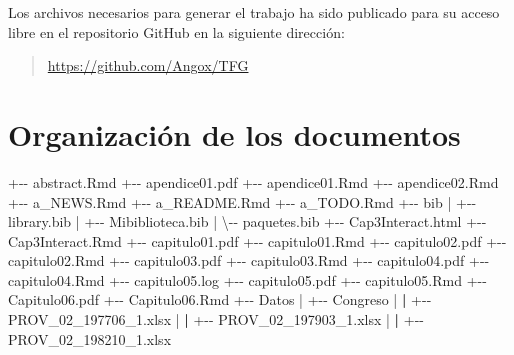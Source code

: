 \documentclass[12pt,a4paper,]{book}
\newenvironment{Shaded}{\begin{snugshade}}{\end{snugshade}}
\newcommand{\ErrorTok}[1]{\textcolor[rgb]{0.64,0.00,0.00}{\textbf{#1}}}
\newcommand{\NormalTok}[1]{#1}
\newcommand{\SpecialCharTok}[1]{\textcolor[rgb]{0.00,0.00,0.00}{#1}}
\numberwithin{dummy}{section}
\theoremstyle{ocrenumbox}
\theoremstyle{blacknumex}
\theoremstyle{blacknumbox}
\theoremstyle{ocrenum}
\theoremstyle{ocrenum}
\begin{document}
Los archivos necesarios para generar el trabajo ha sido publicado para
su acceso libre en el repositorio GitHub en la siguiente dirección:

\begin{quote}
\url{https://github.com/Angox/TFG}
\end{quote}

\hypertarget{organizaciuxf3n-de-los-documentos}{%
\section{Organización de los
documentos}\label{organizaciuxf3n-de-los-documentos}}

\begin{Shaded}
\begin{Highlighting}[]
\SpecialCharTok{+{-}{-}}\NormalTok{ abstract.Rmd}
\SpecialCharTok{+{-}{-}}\NormalTok{ apendice01.pdf}
\SpecialCharTok{+{-}{-}}\NormalTok{ apendice01.Rmd}
\SpecialCharTok{+{-}{-}}\NormalTok{ apendice02.Rmd}
\SpecialCharTok{+{-}{-}}\NormalTok{ a\_NEWS.Rmd}
\SpecialCharTok{+{-}{-}}\NormalTok{ a\_README.Rmd}
\SpecialCharTok{+{-}{-}}\NormalTok{ a\_TODO.Rmd}
\SpecialCharTok{+{-}{-}}\NormalTok{ bib}
\SpecialCharTok{|}   \SpecialCharTok{+{-}{-}}\NormalTok{ library.bib}
\SpecialCharTok{|}   \SpecialCharTok{+{-}{-}}\NormalTok{ Mibiblioteca.bib}
\SpecialCharTok{|}\NormalTok{   \textbackslash{}}\SpecialCharTok{{-}{-}}\NormalTok{ paquetes.bib}
\SpecialCharTok{+{-}{-}}\NormalTok{ Cap3Interact.html}
\SpecialCharTok{+{-}{-}}\NormalTok{ Cap3Interact.Rmd}
\SpecialCharTok{+{-}{-}}\NormalTok{ capitulo01.pdf}
\SpecialCharTok{+{-}{-}}\NormalTok{ capitulo01.Rmd}
\SpecialCharTok{+{-}{-}}\NormalTok{ capitulo02.pdf}
\SpecialCharTok{+{-}{-}}\NormalTok{ capitulo02.Rmd}
\SpecialCharTok{+{-}{-}}\NormalTok{ capitulo03.pdf}
\SpecialCharTok{+{-}{-}}\NormalTok{ capitulo03.Rmd}
\SpecialCharTok{+{-}{-}}\NormalTok{ capitulo04.pdf}
\SpecialCharTok{+{-}{-}}\NormalTok{ capitulo04.Rmd}
\SpecialCharTok{+{-}{-}}\NormalTok{ capitulo05.log}
\SpecialCharTok{+{-}{-}}\NormalTok{ capitulo05.pdf}
\SpecialCharTok{+{-}{-}}\NormalTok{ capitulo05.Rmd}
\SpecialCharTok{+{-}{-}}\NormalTok{ Capitulo06.pdf}
\SpecialCharTok{+{-}{-}}\NormalTok{ Capitulo06.Rmd}
\SpecialCharTok{+{-}{-}}\NormalTok{ Datos}
\SpecialCharTok{|}   \SpecialCharTok{+{-}{-}}\NormalTok{ Congreso}
\SpecialCharTok{|}   \ErrorTok{|}   \SpecialCharTok{+{-}{-}}\NormalTok{ PROV\_02\_197706\_1.xlsx}
\SpecialCharTok{|}   \ErrorTok{|}   \SpecialCharTok{+{-}{-}}\NormalTok{ PROV\_02\_197903\_1.xlsx}
\SpecialCharTok{|}   \ErrorTok{|}   \SpecialCharTok{+{-}{-}}\NormalTok{ PROV\_02\_198210\_1.xlsx}

\end{Highlighting}
\end{Shaded}
\end{document}
